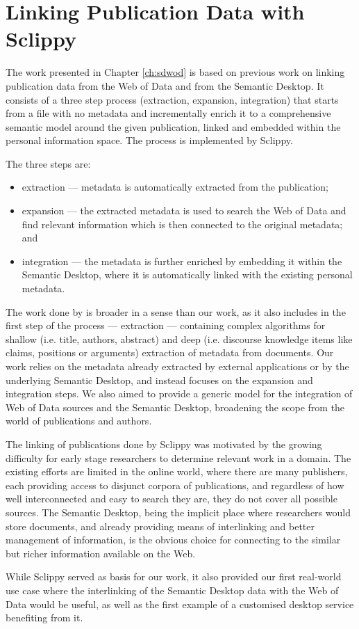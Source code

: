 \section{Linking Publication Data with Sclippy}

The work presented in Chapter \ref{ch:sdwod} is based on previous work \cite{Groza2009} on linking publication data from the Web of Data and from the Semantic Desktop. It consists of a three step process (extraction, expansion, integration) that starts from a file with no metadata and incrementally enrich it to a comprehensive semantic model around the given publication, linked and embedded within the personal information space. The process is implemented by Sclippy. 

The three steps are: 
\begin{itemize}
 \item extraction --- metadata is automatically extracted from the publication; 
 \item expansion --- the extracted metadata is used to search the Web of Data and find relevant information which is then connected to the original metadata; and 
 \item integration --- the metadata is further enriched by embedding it within the Semantic Desktop, where it is automatically linked with the existing personal metadata.
\end{itemize}

The work done by \cite{Groza2009a} is broader in a sense than our work, as it also includes in the first step of the process --- extraction --- containing complex algorithms for shallow (i.e. title, authors, abstract) and deep (i.e. discourse knowledge items like claims, positions or arguments) extraction of metadata from documents. Our work relies on the metadata already extracted by external applications or by the underlying Semantic Desktop, and instead focuses on the expansion and integration steps. We also aimed to provide a generic model for the integration of Web of Data sources and the Semantic Desktop, broadening the scope from the world of publications and authors.

The linking of publications done by Sclippy was motivated by the growing difficulty for early stage researchers to determine relevant work in a domain. The existing efforts are limited in the online world, where there are many publishers, each providing access to disjunct corpora of publications, and regardless of how well interconnected and easy to search they are, they do not cover all possible sources. The Semantic Desktop, being the implicit place where researchers would store documents, and already providing means of interlinking and better management of information, is the obvious choice for connecting to the similar but richer information available on the Web.

While Sclippy served as basis for our work, it also provided our first real-world use case where the interlinking of the Semantic Desktop data with the Web of Data would be useful, as well as the first example of a customised desktop service benefiting from it.
